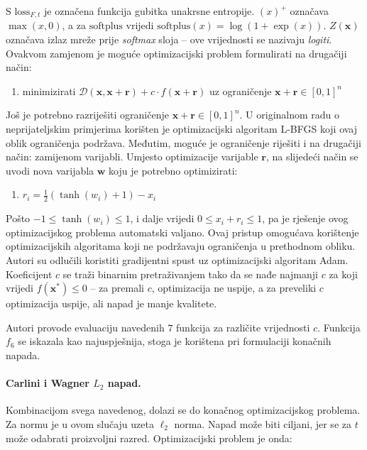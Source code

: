 \documentclass[utf8, diplomski]{fer}
\begin{document}
S $\text{loss}_{F,t}$ je označena funkcija gubitka unakrsne entropije. $(x)^{+}$ označava $\max(x, 0)$, a za $\text{softplus}$ vrijedi $\text{softplus}(x) = \log(1+\exp(x))$. $Z(\boldsymbol{x})$ označava izlaz mreže prije \textit{softmax} sloja -- ove vrijednosti se nazivaju \textit{logiti}. Ovakvom zamjenom je moguće optimizacijski problem formulirati na drugačiji način:

\begin{enumerate}[noitemsep, label={}]
  \item minimizirati $\mathcal{D}(\boldsymbol{x}, \boldsymbol{x} + \boldsymbol{r}) + c\cdot f(\boldsymbol{x} + \boldsymbol{r})$ uz ograničenje $\boldsymbol{x} + \boldsymbol{r} \in [0,1]^{n}$
\end{enumerate}

Još je potrebno razriješiti ograničenje $\boldsymbol{x} + \boldsymbol{r} \in [0,1]^{n}$. U originalnom radu o neprijateljskim primjerima\citep{Szegedy2014IntriguingPO} korišten je optimizacijski algoritam L-BFGS koji ovaj oblik ograničenja podržava. Međutim, moguće je ograničenje riješiti i na drugačiji način: zamijenom varijabli. Umjesto optimizacije varijable $\boldsymbol{r}$, na slijedeći način se uvodi nova varijabla $\boldsymbol{w}$ koju je potrebno optimizirati: 
\begin{enumerate}[noitemsep, label={}]
  \item $r_{i} = \frac{1}{2}(\tanh(w_{i}) + 1) - x_{i}$
\end{enumerate}
Pošto $-1 \leq \tanh(w_{i}) \leq 1$, i dalje vrijedi $0 \leq x_{i} + r_{i} \leq 1$, pa je rješenje ovog optimizacijskog problema automatski valjano. Ovaj pristup omogućava korištenje optimizacijskih algoritama koji ne podržavaju ograničenja u prethodnom obliku. Autori su odlučili koristiti gradijentni spust uz optimizacijski algoritam Adam. Koeficijent $c$ se traži binarnim pretraživanjem tako da se nađe najmanji $c$ za koji vrijedi $f(\boldsymbol{x}^{*}) \leq 0$ -- za premali $c$, optimizacija ne uspije, a za preveliki $c$ optimizacija uspije, ali napad je manje kvalitete.

Autori provode evaluaciju navedenih $7$ funkcija za različite vrijednosti $c$. Funkcija $f_{6}$ se iskazala kao najuspješnija, stoga je korištena pri formulaciji konačnih napada.

\paragraph{Carlini i Wagner $L_{2}$ napad.} Kombinacijom svega navedenog, dolazi se do konačnog optimizacijskog problema. Za normu je u ovom slučaju uzeta $\ell_{2}$ norma. Napad može biti ciljani, jer se za $t$ može odabrati proizvoljni razred. Optimizacijski problem je onda:
\end{document}
